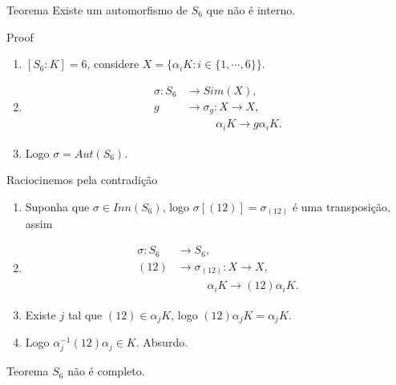 \begin{frame}{}
  \begin{block}{Teorema}
    Existe um automorfismo de $S_6$ que não é interno.     
  \end{block}
  \begin{block}{Proof}
    \begin{enumerate}
      \item $[S_6:K]=6$, considere $X=\{\alpha_i K:i\in\{1,\cdots,6\}\}$.
      \item
        \begin{align*}
          \sigma:S_6&\to Sim(X),\\
                   g&\to \sigma_g:X\to X,\\
                    &\phantom{\to\sigma_g}\,\alpha_i K\to g\alpha_i K.
        \end{align*}
      \item Logo $\sigma=Aut(S_6)$.
    \end{enumerate}
  \end{block}
\end{frame}
\begin{frame}
  \begin{block}{}
    Raciocinemos pela contradição
    \begin{enumerate}
      \item Suponha que $\sigma\in Inn(S_6)$, logo $\sigma[(12)]=\sigma_{(12)}$ é uma transposição, assim
      \item
        \begin{align*}
          \sigma:S_6&\to S_6,\\
                   (12)&\to \sigma_(12):X\to X,\\
                    &\phantom{\to\sigma_g}\,\alpha_i K\to (12)\alpha_i K.
        \end{align*}
      \item Existe $j$ tal que $(12)\in \alpha_{j}K$, logo $(12)\alpha_jK=\alpha_j K$.
      \item Logo $\alpha_j^{-1}(12)\alpha_j\in K$. Absurdo.
    \end{enumerate}
  \end{block}
  \begin{block}{Teorema}
    $S_6$ não é completo.        
  \end{block}
\end{frame}
